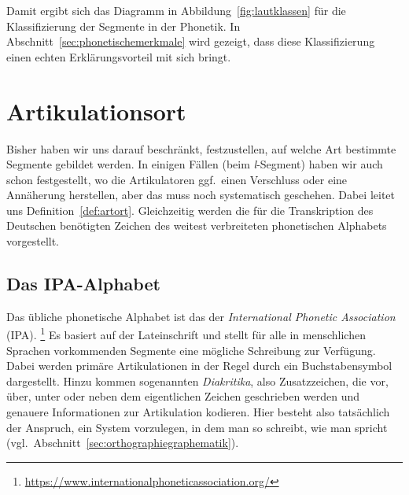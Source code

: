 Damit ergibt sich das Diagramm in Abbildung~\ref{fig:lautklassen} für die Klassifizierung der Segmente in der Phonetik.
In Abschnitt~\ref{sec:phonetischemerkmale} wird gezeigt, dass diese Klassifizierung einen echten Erklärungsvorteil mit sich bringt.




\section{Artikulationsort}

\label{sec:artikulationsort}

Bisher haben wir uns darauf beschränkt, festzustellen, auf welche Art bestimmte Segmente gebildet werden.
In einigen Fällen (\zB beim \textit{l}-Segment) haben wir auch schon festgestellt, wo die Artikulatoren ggf.\ einen Verschluss oder eine Annäherung herstellen, aber das muss noch systematisch geschehen.
Dabei leitet uns Definition~\ref{def:artort}.
Gleichzeitig werden die für die Transkription des Deutschen benötigten Zeichen des weitest verbreiteten phonetischen Alphabets vorgestellt.


\subsection{Das IPA-Alphabet}

\label{sec:ipaalphabet}

Das übliche phonetische Alphabet ist das der \textit{International Phonetic Association} (IPA).%
\footnote{\url{https://www.internationalphoneticassociation.org/}}	
Es basiert auf der Lateinschrift und stellt für alle in menschlichen Sprachen vorkommenden Segmente eine mögliche Schreibung zur Verfügung.
Dabei werden primäre Artikulationen in der Regel durch ein Buchstabensymbol dargestellt.
Hinzu kommen sogenannten \textit{Diakritika}, also Zusatzzeichen, die vor, über, unter oder neben dem eigentlichen Zeichen geschrieben werden und genauere Informationen zur Artikulation kodieren.
Hier besteht also tatsächlich der Anspruch, ein System vorzulegen, in dem man so schreibt, wie man spricht (vgl.\ Abschnitt~\ref{sec:orthographiegraphematik}).

